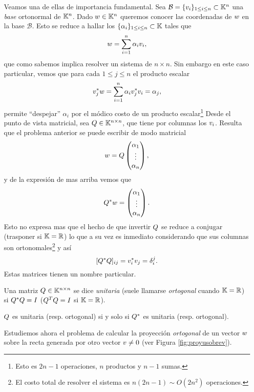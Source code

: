 Veamos una de ellas de importancia fundamental. Sea $\mathcal{B}=\{\vb_i\}_{1\le i\le n}\subset \K^n$ una \emph{base} ortonormal de $\mathbb K^n$. Dado $\wb\in \K^n$ queremos conocer las coordenadas de $\wb$ en la base $\mathcal{B}$. Esto se reduce a hallar los  $\{\alpha_i\}_{1\le i\le n}\subset \mathbb K$ tales que
\begin{equation}
\label{eq:escritura_ort}
\wb=\sum_{i=1}^n\alpha_i\vb_i,
\end{equation}
que como sabemos implica resolver un sistema de $n\times n$. Sin embargo en este caso particular, vemos que para cada $1\le j\le n$ el producto escalar
\begin{equation}
\label{eq:proyecciones}
\vb_j^*\wb=\sum_{i=1}^n\alpha_i\vb_j^*\vb_i=\alpha_j,
\end{equation}
permite ``despejar'' $\alpha_i$ por el módico costo de un producto escalar\footnote{Esto es $2n-1$ operaciones, $n$ productos y $n-1$ sumas.}
Desde el punto de vista matricial, sea $\Qb\in \K^{n\times n}$, que tiene por columnas los $\vb_i$. Resulta que el problema anterior se puede escribir de modo matricial
$$
\wb=\Qb\begin{pmatrix}
        \alpha_1\\
        \vdots\\
        \alpha_n
       \end{pmatrix},
$$
y de la expresión de mas arriba vemos que
$$
\Qb^*\wb=\begin{pmatrix}
        \alpha_1\\
        \vdots\\
        \alpha_n
       \end{pmatrix}.
$$
Esto no expresa mas que el hecho de que invertir $\Qb$ se reduce a conjugar (trasponer si $\mathbb K=\mathbb R$) lo que a su vez es inmediato considerando que sus columnas son ortonomales\footnote{El costo total de resolver el sistema es $n(2n-1)\sim O(2n^2)$ operaciones. } y así
$$
[\Qb^*\Qb]_{ij}=\vb_i^*\vb_j=\delta_i^j.
$$
Estas matrices tienen un nombre particular.
\begin{definicion}
\label{def:de_unitaria}
 Una matriz $\Qb\in \K^{n\times n}$ se dice \emph{unitaria} (suele llamarse \emph{ortogonal} cuando $\mathbb K=\mathbb R$) si
 $\Qb^*\Qb=\Ib$ ($\Qb^T\Qb=\Ib$ si $\mathbb K=\mathbb R$).
\end{definicion}
\begin{observacion}
$\Qb$ es unitaria (resp. ortogonal) si y solo si $\Qb^*$ es unitaria (resp. ortogonal).
\end{observacion}
Estudiemos ahora el problema de calcular la proyección \emph{ortogonal} de un vector $\wb$ sobre la recta generada por otro vector $\vb\neq \cero$ (ver Figura \ref{fig:proyusobrev}).
